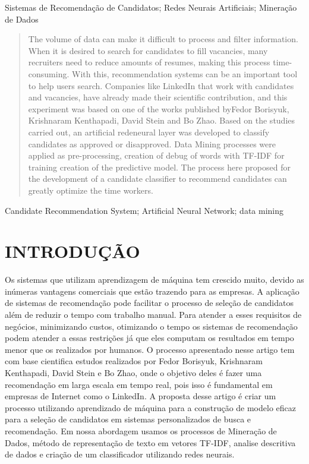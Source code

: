 \documentclass[conference]{IEEEtran}
\begin{document}
\begin{IEEEkeywords}
Sistemas de Recomendação de Candidatos; Redes Neurais Artificiais; Mineração de Dados
\end{IEEEkeywords}
\begin{abstract}
The volume of data can make it difficult to process and filter information. When it is desired to search for candidates to fill vacancies, many recruiters need to reduce amounts of resumes, making this process time-consuming. With this, recommendation systems can be an important tool to help users search. Companies like LinkedIn that work with candidates and vacancies, have already made their scientific contribution, and this experiment was based on one of the works published byFedor Borisyuk, Krishnaram Kenthapadi, David Stein and Bo Zhao. Based on the studies carried out, an artificial redeneural layer was developed to classify candidates as approved or disapproved. Data Mining processes were applied as pre-processing, creation of debug of words with TF-IDF for training creation of the predictive model. The process here proposed for the development of a candidate classifier to recommend candidates can greatly optimize the time workers.

\end{abstract}
\begin{IEEEkeywords}

Candidate Recommendation System; Artificial Neural Network; data mining
\end{IEEEkeywords}

\section{INTRODUÇÃO}


Os sistemas que utilizam aprendizagem de máquina tem crescido muito, devido as inúmeras vantagens comerciais que estão trazendo para as empresas. A aplicação de sistemas de recomendação pode facilitar o processo de seleção de candidatos além de reduzir o tempo com trabalho manual. 
Para atender a esses requisitos de negócios, minimizando custos, otimizando o tempo os sistemas de recomendação podem atender a essas restrições já que eles computam os resultados em tempo menor que os realizados por humanos.
O processo apresentado nesse artigo tem com base cientifica estudos realizados por Fedor Borisyuk, Krishnaram Kenthapadi, David Stein e Bo Zhao, onde o objetivo deles é fazer uma recomendação em larga escala em tempo real, pois isso é fundamental em empresas de Internet como o LinkedIn. 
A proposta desse artigo é criar um processo utilizando aprendizado de máquina para a construção de modelo eficaz para a seleção de candidatos em sistemas personalizados de busca e recomendação. 
Em nossa abordagem usamos os processos de Mineração de Dados, método de representação de texto em vetores TF-IDF, analise descritiva de dados e criação de um classificador utilizando redes neurais.
\end{document}
